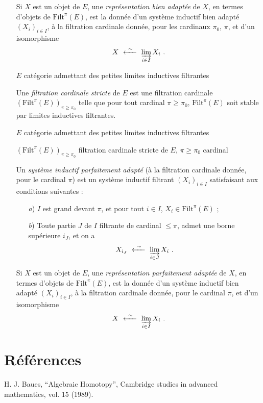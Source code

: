 \documentclass[11pt]{article}
\newcommand{\printedpage}[1]{\marginpar{\footnotesize p.~#1}}
\newcommand{\Filt}{\mathrm{Filt}}
\begin{document}
\begin{itemize}
\printedpage{63}

Si $X$ est un objet de $E$, une \textit{représentation bien adaptée} de $X$, en termes d'objets de $\Filt^{\pi}(E)$, est la donnée d'un système inductif bien adapté $(X_i)_{i\in I}$, à la filtration cardinale donnée, pour les cardinaux $\pi_0$, $\pi$, et d'un isomorphisme
\[
X \ \xleftarrow{\ \sim\ }\ \varinjlim_{i\in I} X_i \ .
\]

\item[\textbullet] $E$ catégorie admettant des petites limites inductives filtrantes

Une \textit{filtration cardinale stricte} de $E$ est une filtration cardinale $(\Filt^{\pi}(E))_{\pi\geq\pi_0}$ telle que pour tout cardinal $\pi \geq \pi_0$, $\Filt^{\pi}(E)$ soit stable par limites inductives filtrantes.

\item[\textbullet] $E$ catégorie admettant des petites limites inductives filtrantes

$(\Filt^{\pi}(E))_{\pi\geq\pi_0}$ filtration cardinale stricte de $E$, \quad $\pi \geq \pi_0$ cardinal

Un \textit{système inductif parfaitement adapté} (à la filtration cardinale donnée, pour le cardinal $\pi$) est un système inductif filtrant $(X_i)_{i\in I}$ satisfaisant aux conditions suivantes :
\begin{itemize}
\item[\textit{a})] $I$ est grand devant $\pi$, et pour tout $i \in I$, $X_i \in \Filt^{\pi}(E)$ ;
\item[\textit{b})] Toute partie $J$ de $I$ filtrante de cardinal $\leq \pi$, admet une borne supérieure $i_J$, et on a
\[
X_{i_J} \ \xleftarrow{\ \sim\ }\ \varinjlim_{i\in J} X_i \ .
\]
\end{itemize}
Si $X$ est un objet de $E$, une \textit{représentation parfaitement adaptée} de $X$, en termes d'objets de $\Filt^{\pi}(E)$, est la donnée d'un système inductif bien adapté $(X_i)_{i\in I}$, à la filtration cardinale donnée, pour le cardinal $\pi$, et d'un isomorphisme
\[
X \ \xleftarrow{\ \sim\ }\ \varinjlim_{i\in I} X_i \ .
\]
\end{itemize}

\printedpage{64}

\section*{Références}

\noindent H. J. Baues, ``Algebraic Homotopy'', Cambridge studies in advanced mathematics, vol. 15 (1989).
\end{document}
